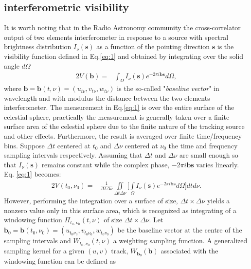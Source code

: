 \subsection{interferometric visibility}
It is worth noting that in the Radio Astronomy community the cross-correlator output of two elements interferometer
in response to a source with spectral brightness distribution $I_{\nu}(\mathbf{s})$ as a function of the pointing direction $\mathbf{s}$ 
is the visibility function defined in Eq.\ref{eq:1} and obtained by integrating
over the solid angle $d\Omega$ \citep{thompson2008interferometry,taylor1999synthesis}
\begin{alignat}{2}
V_{}(\mathbf{b}) =& \int_{\Omega}I_{\nu}(\mathbf{s})e^{-2\pi i \mathbf{b}\mathbf{s}}d\Omega, \label{eq:1}
\end{alignat}
where $\mathbf{b}=\mathbf{b}(t,\nu)=(u_{t\nu}, v_{t\nu}, w_{t\nu})$  is the so-called "\textit{baseline vector}" in wavelength
and with modulus the distance between the two elements
interferometer. The measurement in Eq.\ref{eq:1} is over the entire 
surface of the celestial sphere, practically the measurement is generally taken over a finite surface area of 
the celestial sphere due to the finite nature of the tracking source and other effects. Furthermore, the result is
averaged over finite time/frequency bins. Suppose $\Delta t$ centered at $t_0$ and $\Delta \nu$ centered at $\nu_0$ the 
time and frequency sampling intervals respectively. 
Assuming that $\Delta t$ and  $\Delta \nu$ are small  enough so that $I_{\nu}(\mathbf{s})$
remains constant while the complex phase, $-2\pi i \mathbf{b}\mathbf{s}$ varies linearly.   Eq. \ref{eq:1} becomes:
\begin{alignat}{2}
V_{}(t_0,\nu_0) =& \frac{1}{\Delta t \Delta \nu}\iint\limits_{\Delta t \Delta \nu}^{}\bigg[\int\limits_{\Omega}^{}I_{\nu}(\mathbf{s})e^{-2\pi i \mathbf{b}\mathbf{s}} d\Omega\bigg] dt d\nu. \label{eq:2}	    
\end{alignat}
However, performing the integration over a surface of size, $\Delta t \times \Delta \nu$ yields a nonzero value only in 
this surface area, which is recognized as integrating of a windowing function  $\Pi_{t_0,\nu_0}(t,\nu)$ of size $\Delta t \times \Delta \nu$.
Let $\mathbf{b}_0=\mathbf{b}(t_0,\nu_0)=(u_{t_0\nu_0}, v_{t_0\nu_0}, w_{t_0\nu_0})$ be the baseline vector at the centre
of the sampling intervals and $W_{t_0,\nu_0}(t,\nu)$ a weighting  sampling function. A generalized sampling kernel 
for a given $(u,v)$ track,
$W_{\mathbf{b}_0}(\mathbf{b})$  associated with the windowing function can be defined as
